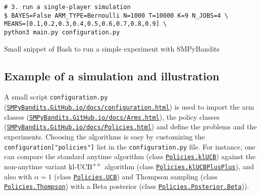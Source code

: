 \begin{small}
\begin{listing}[h!]
    \begin{verbatim}
# 3. run a single-player simulation
$ BAYES=False ARM_TYPE=Bernoulli N=1000 T=10000 K=9 N_JOBS=4 \
MEANS=[0.1,0.2,0.3,0.4,0.5,0.6,0.7,0.8,0.9] \
python3 main.py configuration.py
    \end{verbatim}
    \caption{Small snippet of Bash to run a simple experiment with SMPyBandits}
    \label{lst:3:howToRunBasicLibrary}
\end{listing}
\end{small}


\subsection{Example of a simulation and illustration}

A small script \texttt{configuration.py} (\texttt{\href{https://SMPyBandits.GitHub.io/docs/configuration.html}{SMPyBandits.GitHub.io/docs/configuration.html}}) is used to import the arm classes (\texttt{\href{https://SMPyBandits.GitHub.io/docs/Arms.html}{SMPyBandits.GitHub.io/docs/Arms.html}}), the policy classes (\texttt{\href{https://SMPyBandits.GitHub.io/docs/Policies.html}{SMPyBandits.GitHub.io/docs/Policies.html}}) and define the problems and the experiments.
Choosing the algorithms is easy by customizing the \texttt{configuration["policies"]} list in the \texttt{configuration.py} file.
For instance, one can compare the standard anytime \klUCB{} algorithm (class \texttt{\href{https://SMPyBandits.GitHub.io/docs/Policies.klUCB.html}{Policies.klUCB}}) against the non-anytime variant $\mathrm{kl}\text{-}\mathrm{UCB}^{++}$ algorithm (class \texttt{\href{https://SMPyBandits.GitHub.io/docs/Policies.klUCBPlusPlus.html}{Policies.klUCBPlusPlus}}), and also \UCB{} with $\alpha=1$ (class \texttt{\href{https://SMPyBandits.GitHub.io/docs/Policies.UCBalpha.html}{Policies.UCB}}) and Thompson sampling (class \texttt{\href{https://SMPyBandits.GitHub.io/docs/Policies.Thompson.html}{Policies.Thompson}}) with a Beta posterior (class \texttt{\href{https://SMPyBandits.GitHub.io/docs/Policies.Posterior.Beta.html}{Policies.Posterior.Beta}})).

